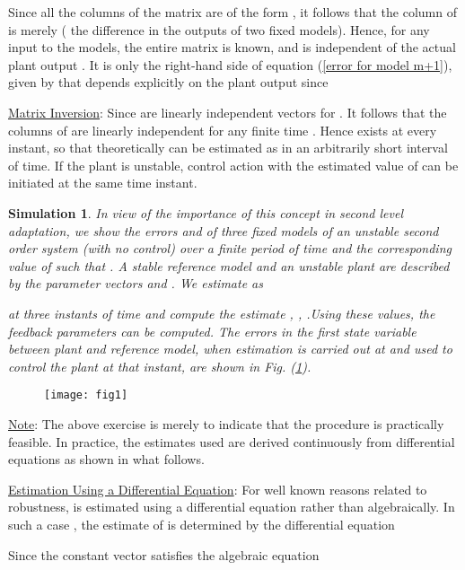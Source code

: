 \documentclass[conference]{IEEEtran}
\newtheorem{Simulation}{Simulation}
\begin{document}
Since all the columns of the matrix  are of the form , it follows that the  column of  is merely  ( the difference in the outputs of two fixed models). Hence, for any input to the  models, the entire matrix  is known, and is independent of the actual plant output . It is only the right-hand side of equation (\ref{error for model m+1}), given by  that depends explicitly on the plant output since


{\large \underline{Matrix Inversion}}: Since  are linearly independent vectors for . It follows that the columns of  are linearly independent for any finite time . Hence  exists at every instant, so that theoretically  can be estimated as  in an arbitrarily short interval of time. If the plant is unstable, control action with the estimated value of  can be initiated at the same time instant.

\begin{Simulation}

 In view of the importance of this concept in second level adaptation, we show the errors  and  of three fixed models of an unstable second order system (with no control) over a finite period of time  and the corresponding value of  such that . A stable reference model and an unstable plant are described by the parameter vectors  and . We estimate  as

at three instants of time  and compute the estimate , , .Using these values, the feedback parameters can be computed. The errors in the first state variable between plant and reference model, when estimation is carried out at  and used to control the plant at that instant, are shown in Fig. (\ref{Fig1}).
\end{Simulation}

\begin{figure}[H]
\texttt{[image: fig1]}
\caption{}
\label{Fig1}
\end{figure}
{\large \underline{Note}}: The above exercise is merely to indicate that the procedure is practically feasible. In practice, the estimates used are derived continuously from differential equations as shown in what follows.




{\large \underline{Estimation Using a Differential Equation}}: For well known reasons related to robustness,  is estimated using a differential equation rather than algebraically. In such a case , the estimate of  is determined by the differential equation

Since the constant vector  satisfies the algebraic equation
\end{document}
